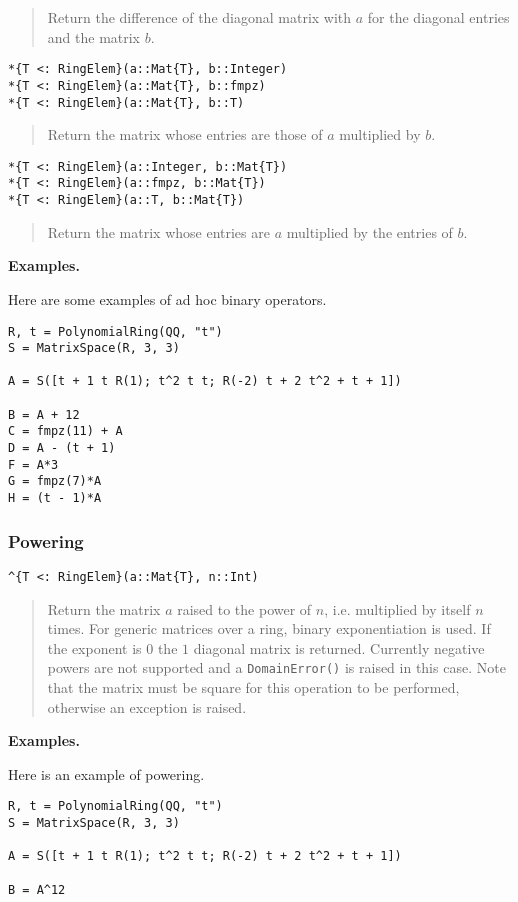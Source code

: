 \documentclass[a4paper,10pt]{article}
\newcommand{\code}{\lstinline}
\newcommand{\desc}[1]{\vspace{-3mm}\begin{quote}#1\end{quote}}
\begin{document}
\desc{Return the difference of the diagonal matrix with $a$ for the diagonal
entries and the matrix $b$.}

\begin{lstlisting}
*{T <: RingElem}(a::Mat{T}, b::Integer)
*{T <: RingElem}(a::Mat{T}, b::fmpz)
*{T <: RingElem}(a::Mat{T}, b::T)
\end{lstlisting}

\desc{Return the matrix whose entries are those of $a$ multiplied by $b$.}

\begin{lstlisting}
*{T <: RingElem}(a::Integer, b::Mat{T})
*{T <: RingElem}(a::fmpz, b::Mat{T})
*{T <: RingElem}(a::T, b::Mat{T})
\end{lstlisting}

\desc{Return the matrix whose entries are $a$ multiplied by the entries of
$b$.}

\textbf{Examples.}

Here are some examples of ad hoc binary operators.

\begin{lstlisting}
R, t = PolynomialRing(QQ, "t")
S = MatrixSpace(R, 3, 3)

A = S([t + 1 t R(1); t^2 t t; R(-2) t + 2 t^2 + t + 1])

B = A + 12
C = fmpz(11) + A
D = A - (t + 1)
F = A*3
G = fmpz(7)*A
H = (t - 1)*A
\end{lstlisting}

\subsubsection{Powering}

\begin{lstlisting}
^{T <: RingElem}(a::Mat{T}, n::Int)
\end{lstlisting}

\desc{Return the matrix $a$ raised to the power of $n$, i.e. multiplied by
itself $n$ times. For generic matrices over a ring, binary exponentiation is
used. If the exponent is $0$ the $1$ diagonal matrix is returned. Currently
negative powers are not supported and a \code{DomainError()} is raised in
this case. Note that the matrix must be square for this operation to be
performed, otherwise an exception is raised.}

\textbf{Examples.}

Here is an example of powering.

\begin{lstlisting}
R, t = PolynomialRing(QQ, "t")
S = MatrixSpace(R, 3, 3)

A = S([t + 1 t R(1); t^2 t t; R(-2) t + 2 t^2 + t + 1])

B = A^12
\end{lstlisting}
\end{document}
